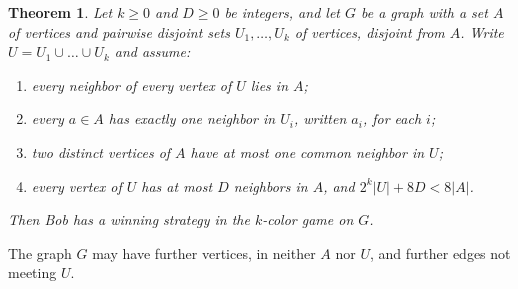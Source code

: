 \documentclass[11pt]{article}
\newtheorem{theorem}{Theorem}[section]
\theoremstyle{remark}
\begin{document}
\begin{theorem}\label{thm:potential}
Let $k\ge0$ and $D\ge0$ be integers, and let $G$ be a graph with a set $A$
of vertices and pairwise disjoint sets $U_1,\dots,U_k$ of vertices,
disjoint from $A$. Write $U=U_1\cup\dots\cup U_k$ and assume:
\begin{enumerate}
\item every neighbor of every vertex of $U$ lies in $A$;
\item every $a\in A$ has exactly one neighbor in $U_i$, written $a_i$, for
each $i$;
\item two distinct vertices of $A$ have at most one common neighbor in $U$;
\item every vertex of $U$ has at most $D$ neighbors in $A$, and
$2^k|U|+8D<8|A|$.
\end{enumerate}
Then Bob has a winning strategy in the $k$-color game on $G$.
\end{theorem}

The graph $G$ may have further vertices, in neither $A$ nor $U$, and
further edges not meeting $U$.
\end{document}
